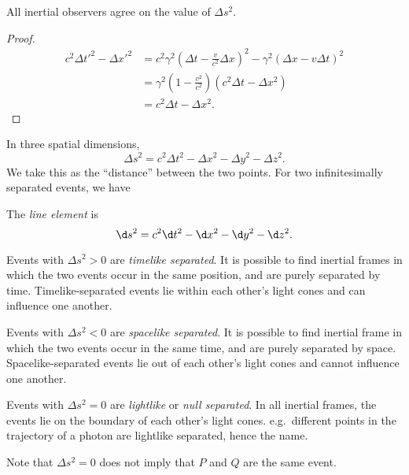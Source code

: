 \documentclass[a4paper]{article}
\begin{document}
\begin{prop}
  All inertial observers agree on the value of $\Delta s^2$.
\end{prop}

\begin{proof}
  \begin{align*}
    c^2 \Delta t'^2 - \Delta x'^2 &= c^2 \gamma^2 \left(\Delta t - \frac{v}{c^2}\Delta x\right)^2 - \gamma^2 (\Delta x - v\Delta t)^2\\
    &= \gamma^2 \left(1 - \frac{v^2}{c^2}\right)(c^2 \Delta t - \Delta x^2)\\
    &= c^2\Delta t - \Delta x^2.
  \end{align*}
\end{proof}

In three spatial dimensions,
\[
  \Delta s^2 = c^2\Delta t^2 - \Delta x^2 - \Delta y^2 - \Delta z^2.
\]
We take this as the ``distance'' between the two points. For two infinitesimally separated events, we have
\begin{defi}
  The \emph{line element} is
  \[
    \d s^2 = c^2 \d t^2 - \d x^2 - \d y^2 - \d z^2.
  \]
\end{defi}

\begin{defi}
  Events with $\Delta s^2 > 0$ are \emph{timelike separated}. It is possible to find inertial frames in which the two events occur in the same position, and are purely separated by time. Timelike-separated events lie within each other's light cones and can influence one another.

  Events with $\Delta s^2 < 0$ are \emph{spacelike separated}. It is possible to find inertial frame in which the two events occur in the same time, and are purely separated by space. Spacelike-separated events lie out of each other's light cones and cannot influence one another.

  Events with $\Delta s^2 = 0$ are \emph{lightlike} or \emph{null separated}. In all inertial frames, the events lie on the boundary of each other's light cones. e.g.\ different points in the trajectory of a photon are lightlike separated, hence the name.
\end{defi}
Note that $\Delta s^2 = 0$ does not imply that $P$ and $Q$ are the same event.
\end{document}
